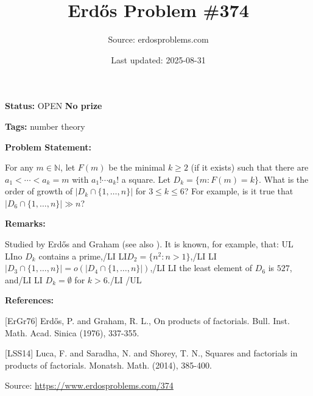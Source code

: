 \documentclass{article}
\title{Erd\H{o}s Problem \#374}
\date{Last updated: 2025-08-31}
\author{Source: erdosproblems.com}
\begin{document}
\maketitle

\noindent\textbf{Status:} OPEN \quad \textbf{No prize}

\noindent\textbf{Tags:} number theory

\medskip
\noindent\textbf{Problem Statement:}

For any $m\in \mathbb{N}$, let $F(m)$ be the minimal $k\geq 2$ (if it exists) such that there are $a_1<\cdots <a_k=m$ with $a_1!\cdots a_k!$ a square. Let $D_k=\{ m : F(m)=k\}$. What is the order of growth of $\lvert D_k\cap\{1,\ldots,n\}\rvert$ for $3\leq k\leq 6$? For example, is it true that $\lvert D_6\cap \{1,\ldots,n\}\rvert \gg n$?

\bigskip
\noindent\textbf{Remarks:}

Studied by Erd\H{o}s and Graham \cite{ErGr76} (see also \cite{LSS14}). It is known, for example, that:
{UL}
{LI}no $D_k$ contains a prime,{/LI}
{LI}$D_2=\{ n^2 : n>1\}$,{/LI}
{LI} $\lvert D_3\cap \{1,\ldots,n\}\rvert = o(\lvert D_4\cap \{1,\ldots,n\}\rvert)$,{/LI}
{LI} the least element of $D_6$ is $527$, and{/LI}
{LI} $D_k=\emptyset$ for $k>6$.{/LI}
{/UL}

\bigskip
\noindent\textbf{References:}

[ErGr76] Erd\H{o}s, P. and Graham, R. L., On products of factorials. Bull. Inst. Math. Acad. Sinica (1976), 337-355.
 
 [LSS14] Luca, F. and Saradha, N. and Shorey, T. N., Squares and factorials in products of factorials. Monatsh. Math. (2014), 385-400.

\bigskip
\noindent\small{Source: \url{https://www.erdosproblems.com/374}}
\end{document}
